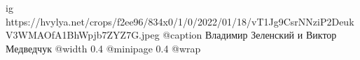  
 
 
 
 

\ifcmt
  ig https://hvylya.net/crops/f2ee96/834x0/1/0/2022/01/18/vT1Jg9CsrNNziP2DeukV3WMAOfA1BhWpjb7ZYZ7G.jpeg
  @caption Владимир Зеленский и Виктор Медведчук
  @width 0.4
  @minipage 0.4
  @wrap \parpic[r]
\fi
